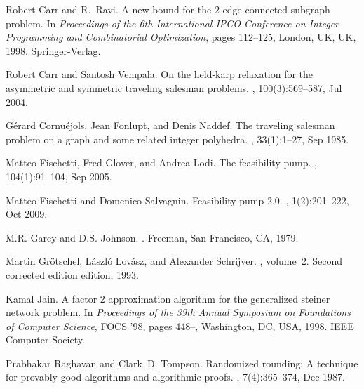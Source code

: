 \documentclass[runningheads]{llncs}
\begin{document}
%
%
%
% 
% 
%
\begin{thebibliography}{10}
	
		Robert Carr and R.~Ravi.
		\newblock A new bound for the 2-edge connected subgraph problem.
		\newblock In {\em Proceedings of the 6th International IPCO Conference on
			Integer Programming and Combinatorial Optimization}, pages 112--125, London,
		UK, UK, 1998. Springer-Verlag.
		
		Robert Carr and Santosh Vempala.
		\newblock On the held-karp relaxation for the asymmetric and symmetric
		traveling salesman problems.
		, 100(3):569--587, Jul 2004.
		
		G{\'e}rard Cornu{\'e}jols, Jean Fonlupt, and Denis Naddef.
		\newblock The traveling salesman problem on a graph and some related integer
		polyhedra.
		, 33(1):1--27, Sep 1985.
		
		Matteo Fischetti, Fred Glover, and Andrea Lodi.
		\newblock The feasibility pump.
		, 104(1):91--104, Sep 2005.
		
		Matteo Fischetti and Domenico Salvagnin.
		\newblock Feasibility pump 2.0.
		, 1(2):201--222, Oct 2009.
		
		M.R. Garey and D.S. Johnson.
		.
		\newblock Freeman, San Francisco, CA, 1979.
		
		Martin Gr{\"o}tschel, L{\'a}szl{\'o} Lov{\'a}sz, and Alexander Schrijver.
		, volume~2.
		\newblock Second corrected edition edition, 1993.
		
		Kamal Jain.
		\newblock A factor 2 approximation algorithm for the generalized steiner
		network problem.
		\newblock In {\em Proceedings of the 39th Annual Symposium on Foundations of
			Computer Science}, FOCS '98, pages 448--, Washington, DC, USA, 1998. IEEE
		Computer Society.
		
		Prabhakar Raghavan and Clark~D. Tompson.
		\newblock Randomized rounding: A technique for provably good algorithms and
		algorithmic proofs.
		, 7(4):365--374, Dec 1987.
		

\end{thebibliography}
\end{document}
